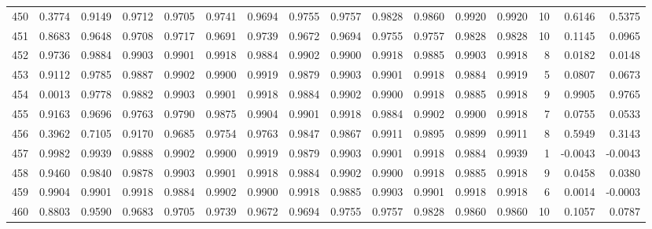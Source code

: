 \begin{tabular}{lrrrrrrrrrrrrrrr}
450 &      0.3774 &  0.9149 &  0.9712 &  0.9705 &  0.9741 &  0.9694 &  0.9755 &  0.9757 &  0.9828 &  0.9860 &   0.9920 &     0.9920 &     10 &                    0.6146 &                     0.5375 \\
451 &      0.8683 &  0.9648 &  0.9708 &  0.9717 &  0.9691 &  0.9739 &  0.9672 &  0.9694 &  0.9755 &  0.9757 &   0.9828 &     0.9828 &     10 &                    0.1145 &                     0.0965 \\
452 &      0.9736 &  0.9884 &  0.9903 &  0.9901 &  0.9918 &  0.9884 &  0.9902 &  0.9900 &  0.9918 &  0.9885 &   0.9903 &     0.9918 &      8 &                    0.0182 &                     0.0148 \\
453 &      0.9112 &  0.9785 &  0.9887 &  0.9902 &  0.9900 &  0.9919 &  0.9879 &  0.9903 &  0.9901 &  0.9918 &   0.9884 &     0.9919 &      5 &                    0.0807 &                     0.0673 \\
454 &      0.0013 &  0.9778 &  0.9882 &  0.9903 &  0.9901 &  0.9918 &  0.9884 &  0.9902 &  0.9900 &  0.9918 &   0.9885 &     0.9918 &      9 &                    0.9905 &                     0.9765 \\
455 &      0.9163 &  0.9696 &  0.9763 &  0.9790 &  0.9875 &  0.9904 &  0.9901 &  0.9918 &  0.9884 &  0.9902 &   0.9900 &     0.9918 &      7 &                    0.0755 &                     0.0533 \\
456 &      0.3962 &  0.7105 &  0.9170 &  0.9685 &  0.9754 &  0.9763 &  0.9847 &  0.9867 &  0.9911 &  0.9895 &   0.9899 &     0.9911 &      8 &                    0.5949 &                     0.3143 \\
457 &      0.9982 &  0.9939 &  0.9888 &  0.9902 &  0.9900 &  0.9919 &  0.9879 &  0.9903 &  0.9901 &  0.9918 &   0.9884 &     0.9939 &      1 &                   -0.0043 &                    -0.0043 \\
458 &      0.9460 &  0.9840 &  0.9878 &  0.9903 &  0.9901 &  0.9918 &  0.9884 &  0.9902 &  0.9900 &  0.9918 &   0.9885 &     0.9918 &      9 &                    0.0458 &                     0.0380 \\
459 &      0.9904 &  0.9901 &  0.9918 &  0.9884 &  0.9902 &  0.9900 &  0.9918 &  0.9885 &  0.9903 &  0.9901 &   0.9918 &     0.9918 &      6 &                    0.0014 &                    -0.0003 \\
460 &      0.8803 &  0.9590 &  0.9683 &  0.9705 &  0.9739 &  0.9672 &  0.9694 &  0.9755 &  0.9757 &  0.9828 &   0.9860 &     0.9860 &     10 &                    0.1057 &                     0.0787 \\

\end{tabular}
